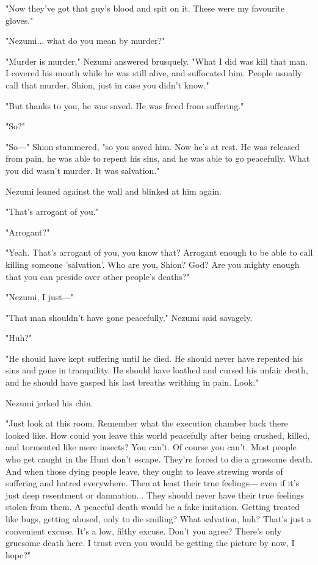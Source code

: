 "Now they've got that guy's blood and spit on it. These were my
favourite gloves."

"Nezumi... what do you mean by murder?"

"Murder is murder," Nezumi answered brusquely. "What I did was kill that
man. I covered his mouth while he was still alive, and suffocated him.
People usually call that murder, Shion, just in case you didn't know."

"But thanks to you, he was saved. He was freed from suffering."

"So?"

"So―" Shion stammered, "so you saved him. Now he's at rest. He was
released from pain, he was able to repent his sins, and he was able to
go peacefully. What you did wasn't murder. It was salvation."

Nezumi leaned against the wall and blinked at him again.

"That's arrogant of you."

"Arrogant?"

"Yeah. That's arrogant of you, you know that? Arrogant enough to be able
to call killing someone 'salvation'. Who are you, Shion? God? Are you
mighty enough that you can preside over other people's deaths?"

"Nezumi, I just―"

"That man shouldn't have gone peacefully," Nezumi said savagely.

"Huh?"

"He should have kept suffering until he died. He should never have
repented his sins and gone in tranquility. He should have loathed and
cursed his unfair death, and he should have gasped his last breaths
writhing in pain. Look."

Nezumi jerked his chin.

"Just look at this room. Remember what the execution chamber back there
looked like. How could you leave this world peacefully after being
crushed, killed, and tormented like mere insects? You can't. Of course
you can't. Most people who get caught in the Hunt don't escape. They're
forced to die a gruesome death. And when those dying people leave, they
ought to leave strewing words of suffering and hatred everywhere. Then
at least their true feelings― even if it's just deep resentment or
damnation... They should never have their true feelings stolen from
them. A peaceful death would be a fake imitation. Getting treated like
bugs, getting abused, only to die smiling? What salvation, huh? That's
just a convenient excuse. It's a low, filthy excuse. Don't you agree?
There's only gruesome death here. I trust even you would be getting the
picture by now, I hope?"

